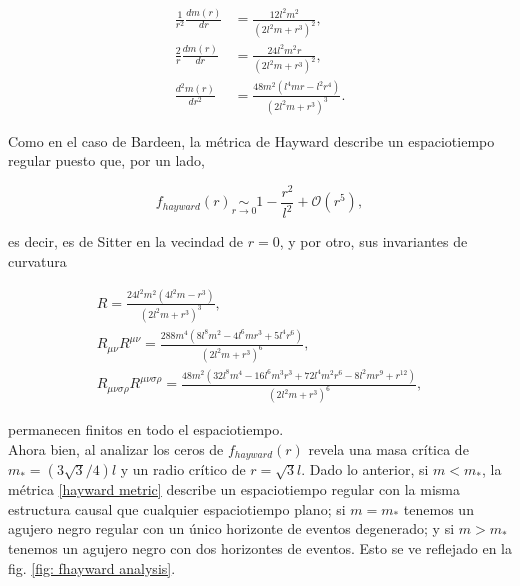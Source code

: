 \documentclass{article}
\numberwithin{equation}{section}
\theoremstyle{definition}
\begin{document}
\begin{equation}
\begin{aligned}
\frac{1}{r^2}\frac{dm(r)}{dr} &= \frac{12 l^2 m^2}{\left(2 l^2 m+r^3\right)^2},\\
\frac{2}{r}\frac{dm(r)}{dr} &= \frac{24 l^2 m^2 r}{\left(2 l^2 m+r^3\right)^2},\\
\frac{d^2m(r)}{dr^2} &= \frac{48 m^2 \left(l^4 m r-l^2 r^4\right)}{\left(2 l^2 m+r^3\right)^3}.
\end{aligned}
\end{equation}

Como en el caso de Bardeen, la métrica de Hayward describe un espaciotiempo regular puesto que, por un lado, 

\begin{equation}
f_{hayward}(r) \underset{r \to 0}{\sim} 1 - \frac{r^2}{l^2} + \mathcal{O}(r^5),
\end{equation}

es decir, es de Sitter en la vecindad de $r =0$, y por otro, sus invariantes de curvatura

\begin{equation}
\label{hayward scalars}
\begin{gathered}
R = \frac{24 l^2 m^2 \left(4 l^2 m-r^3\right)}{\left(2 l^2 m+r^3\right)^3},\\
R_{\mu \nu}R^{\mu \nu} = \frac{288 m^4 \left(8 l^8 m^2-4 l^6 m r^3+5 l^4 r^6\right)}{\left(2 l^2 m+r^3\right)^6},\\
R_{\mu \nu \sigma \rho}R^{\mu \nu \sigma \rho} = \frac{48 m^2 \left(32 l^8 m^4-16 l^6 m^3 r^3+72 l^4 m^2 r^6-8 l^2 m r^9+r^{12}\right)}{\left(2 l^2 m+r^3\right)^6},
\end{gathered}
\end{equation}

permanecen finitos en todo el espaciotiempo.\\

Ahora bien, al analizar los ceros de $f_{hayward}(r)$ revela una masa crítica de $m_{*} = (3\sqrt{3}/4)l$ y un radio crítico de $r = \sqrt{3}l$. Dado lo anterior, si $m < m_{*}$, la métrica \ref{hayward metric} describe un espaciotiempo regular con la misma estructura causal que cualquier espaciotiempo plano; si $m = m_{*}$ tenemos un agujero negro regular con un único horizonte de eventos degenerado; y si $m > m_{*}$ tenemos un agujero negro con dos horizontes de eventos. Esto se ve reflejado en la fig. \ref{fig: fhayward analysis}. 
\end{document}
